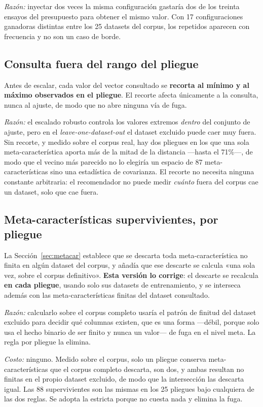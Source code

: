\documentclass[11pt,letterpaper]{article}
\begin{document}
\textit{Razón:} inyectar dos veces la misma configuración gastaría dos de los
treinta ensayos del presupuesto para obtener el mismo valor. Con 17
configuraciones ganadoras distintas entre los 25 datasets del corpus, los
repetidos aparecen con frecuencia y no son un caso de borde.

\subsection{Consulta fuera del rango del pliegue}

Antes de escalar, cada valor del vector consultado se \textbf{recorta al mínimo y
al máximo observados en el pliegue}. El recorte afecta únicamente a la consulta,
nunca al ajuste, de modo que no abre ninguna vía de fuga.

\textit{Razón:} el escalado robusto controla los valores extremos \emph{dentro}
del conjunto de ajuste, pero en el \textit{leave-one-dataset-out} el dataset
excluido puede caer muy fuera. Sin recorte, y medido sobre el corpus real, hay dos
pliegues en los que una sola meta-característica aporta más de la mitad de la
distancia —hasta el 71\%—, de modo que el vecino más parecido no lo elegiría un
espacio de 87 meta-características sino una estadística de covarianza. El recorte
no necesita ninguna constante arbitraria: el recomendador no puede medir
\emph{cuánto} fuera del corpus cae un dataset, solo que cae fuera.

\subsection{Meta-características supervivientes, por pliegue}
\label{sec:supervivientes}

La Sección~\ref{sec:metacar} establece que se descarta toda meta-característica no
finita en algún dataset del corpus, y añadía que ese descarte se calcula «una sola
vez, sobre el corpus definitivo». \textbf{Esta versión lo corrige}: el descarte se
recalcula \textbf{en cada pliegue}, usando solo sus datasets de entrenamiento, y
se interseca además con las meta-características finitas del dataset consultado.

\textit{Razón:} calcularlo sobre el corpus completo usaría el patrón de finitud
del dataset excluido para decidir qué columnas existen, que es una forma —débil,
porque solo usa el hecho binario de ser finito y nunca un valor— de fuga en el
nivel meta. La regla por pliegue la elimina.

\textit{Costo:} ninguno. Medido sobre el corpus, solo un pliegue conserva
meta-características que el corpus completo descarta, son dos, y ambas resultan no
finitas en el propio dataset excluido, de modo que la intersección las descarta
igual. Las 88 supervivientes son las mismas en los 25 pliegues bajo cualquiera de
las dos reglas. Se adopta la estricta porque no cuesta nada y elimina la fuga.
\end{document}
